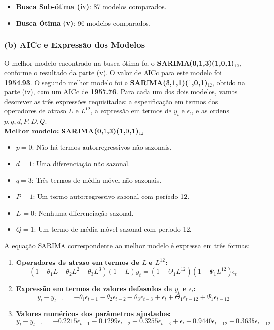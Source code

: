 \documentclass[a4paper, 12pt]{article}
\begin{document}
\begin{itemize}
    \item \textbf{Busca Sub-ótima (iv)}: 87 modelos comparados.
    \item \textbf{Busca Ótima (v)}: 96 modelos comparados.
\end{itemize}

\subsubsection{(b) AICc e Expressão dos Modelos}

O melhor modelo encontrado na busca ótima foi o \textbf{SARIMA(0,1,3)(1,0,1)$_{12}$}, conforme o resultado da parte (v). O valor de AICc para este modelo foi \textbf{1954.93}. O segundo melhor modelo foi o \textbf{SARIMA(3,1,1)(1,0,1)$_{12}$}, obtido na parte (iv), com um AICc de \textbf{1957.76}. Para cada um dos dois modelos, vamos descrever as três expressões requisitadas: a especificação em termos dos operadores de atraso \( L \) e \( L^{12} \), a expressão em termos de \( y_t \) e \( \epsilon_t \), e as ordens \( p, q, d, P, D, Q \).\\

\textbf{Melhor modelo: SARIMA(0,1,3)(1,0,1)$_{12}$}

\begin{itemize}
    \item \( p = 0 \): Não há termos autorregressivos não sazonais.
    \item \( d = 1 \): Uma diferenciação não sazonal.
    \item \( q = 3 \): Três termos de média móvel não sazonais.
    \item \( P = 1 \): Um termo autorregressivo sazonal com período 12.
    \item \( D = 0 \): Nenhuma diferenciação sazonal.
    \item \( Q = 1 \): Um termo de média móvel sazonal com período 12.
\end{itemize}

A equação SARIMA correspondente ao melhor modelo é expressa em três formas:

\begin{enumerate}
    \item \textbf{Operadores de atraso em termos de \( L \) e \( L^{12} \):}
    \[
    (1 - \theta_1 L - \theta_2 L^2 - \theta_3 L^3)(1 - L) y_t = (1 - \Theta_1 L^{12})(1 - \Psi_1 L^{12}) \epsilon_t
    \]
    
    \item \textbf{Expressão em termos de valores defasados de \( y_t \) e \( \epsilon_t \):}
    \[
    y_t - y_{t-1} = -\theta_1 \epsilon_{t-1} - \theta_2 \epsilon_{t-2} - \theta_3 \epsilon_{t-3} + \epsilon_t + \Theta_1 \epsilon_{t-12} + \Psi_1 \epsilon_{t-12}
    \]

    \item \textbf{Valores numéricos dos parâmetros ajustados:}
    \[
    y_t - y_{t-1} = -0.2215 \epsilon_{t-1} - 0.1299 \epsilon_{t-2} - 0.3255 \epsilon_{t-3} + \epsilon_t + 0.9440 \epsilon_{t-12} - 0.3635 \epsilon_{t-12}
    \]
\end{enumerate}
\end{document}
